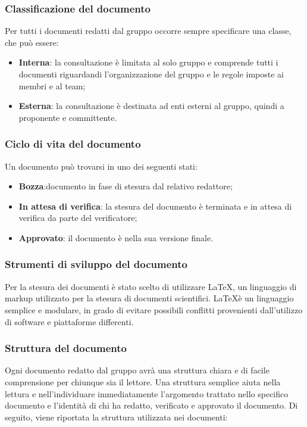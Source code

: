 		\subsubsection{Classificazione del documento}
		Per tutti i documenti redatti dal gruppo occorre sempre specificare una classe, che può essere:
		\begin{itemize}
		\item \textbf{Interna}: la consultazione è limitata al solo gruppo e comprende tutti i documenti riguardandi l'organizzazione del gruppo e le regole imposte ai membri e al team;
		\item \textbf{Esterna}: la consultazione è destinata ad enti esterni al gruppo, quindi a proponente e committente.
		\end{itemize} 
	
		\subsubsection{Ciclo di vita del documento}
		Un documento può trovarsi in uno dei seguenti stati:
		\begin{itemize}
			\item \textbf{Bozza}:documento in fase di stesura dal relativo redattore;
			\item \textbf{In attesa di verifica}: la stesura del documento è terminata e in attesa di verifica da parte del verificatore;
			\item \textbf{Approvato}: il documento è nella sua versione finale.
		\end{itemize}
				
		\subsubsection{Strumenti di sviluppo del documento}
		Per la stesura dei documenti è stato scelto di utilizzare \LaTeX, un linguaggio di markup utilizzato per la stesura di documenti scientifici. \LaTeX è un linguaggio semplice e modulare, in grado di evitare possibili conflitti provenienti dall'utilizzo di software e piattaforme differenti.
	
		\subsubsection{Struttura del documento}
		Ogni documento redatto dal gruppo avrà una struttura chiara e di facile comprensione per chiunque sia il lettore. Una struttura semplice aiuta nella lettura e nell'individuare immediatamente l'argomento trattato nello specifico documento e l'identità di chi ha redatto, verificato e approvato il documento.
		Di seguito, viene riportata la struttura utilizzata nei documenti:

